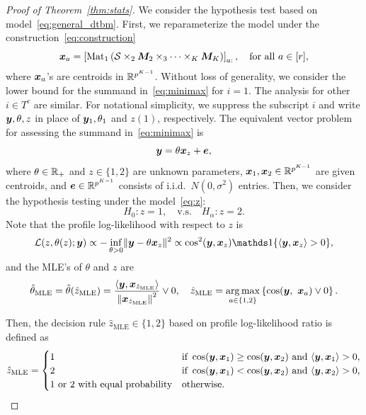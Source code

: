 \documentclass[lettersize,onecolumn,journal]{IEEEtran}
\theoremstyle{definition}
\theoremstyle{definition}
\newcommand{\of}[1]{\left(#1\right)}
\newcommand{\off}[1]{\left[#1\right]}
\newcommand{\offf}[1]{\left\{#1\right\}}
\begin{document}
\begin{proof}[Proof of Theorem~\ref{thm:stats}]
We consider the hypothesis test based on model~\eqref{eq:general_dtbm}. First, we reparameterize the model under the construction~\eqref{eq:construction}
\begin{equation}
    \mx_a = \off{\mat_1 \of{ \tS\times_2 \mM_2\times_3\cdots \times_K \mM_K  }}_{a:}, \quad \text{for all} \ a \in [r],
\end{equation}
where $\bm x_a$'s are centroids in $\mathbb{R}^{p^{K-1}}$. Without loss of generality, we consider the lower bound for the summand in~\eqref{eq:minimax} for $i=1$. The analysis for other $i\in T^c$ are similar. For notational simplicity, we suppress the subscript $i$ and write $\bm{y}, \theta, z$ in place of $\bm{y}_1, \theta_1$ and $z(1)$, respectively. The equivalent vector problem for assessing the summand in~\eqref{eq:minimax} is
\begin{equation}\label{eq:z}
\my=\theta\mx_{z}+\me,
\end{equation}
where $\theta\in\mathbb{R}_{+}$ and $z\in \{1,2\}$ are unknown parameters, $\bm x_1,\bm x_2\in\mathbb{R}^{p^{K-1}}$ are given centroids, and $\bm{e}\in\mathbb{R}^{p^{K-1}}$ consists of i.i.d.\ $N(0,\sigma^2)$ entries.  Then, we consider the hypothesis testing under the model~\eqref{eq:z}:
\begin{equation}\label{eq:test}
H_0\colon z=1, \quad \text{v.s.}\quad H_\alpha\colon z=2.
\end{equation}
Note that the profile log-likelihood with respect to $z$ is
\[
\tL(z,  \theta(z);\my)\propto - \inf_{\theta>0}\onormSize{}{\my- \theta\mx_{z}}^2 \propto  \cos^2(\my, \mx_{z}) \ind\{ \langle \my,\mx_{z}\rangle  >0 \}, 
\]
and the MLE's of $\theta$ and $z$ are
\begin{equation}\label{eq:MLE}
    \hat \theta_{\text{MLE}}= \hat \theta(\hat z_{\text{MLE}})={\langle \my,\mx_{\hat z_{\text{MLE}}}\rangle \over \onorm{\mx_{\hat z_{\text{MLE}}}}^2}\vee 0 , \quad 
\hat z_{\text{MLE}}= \argmax_{a\in\{1,2\}} \offf{\cos(\my,\ \mx_a)\vee 0}. 
\end{equation}

Then, the decision rule $\hat z_{\text{MLE}} \in\{1,2\}$ based on profile log-likelihood ratio is defined as
\begin{equation}\label{eq:ratio}
\hat z_{\text{MLE}}=
\begin{cases}
1 & \text{if }\cos(\my,\mx_1)\geq  \cos(\my,\mx_2) \text{ and }\langle \my,\mx_1\rangle > 0, \\
2 & \text{if }\cos(\my,\mx_1)<\cos(\my,\mx_2) \text{ and }\langle \my,\mx_2\rangle > 0,\\
\text{1 or 2 with equal probability} & \text{otherwise.}
\end{cases}
\end{equation}


\end{proof}
\end{document}
